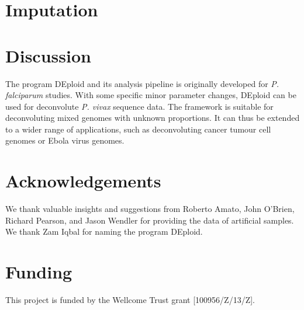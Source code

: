 \documentclass{bioinfo}
\begin{document}
\section{Imputation}


\section{Discussion}
The program DEploid and its analysis pipeline is originally developed for {\it P. falciparum} studies. With some specific minor parameter changes, DEploid can be used for deconvolute {\it P. vivax} sequence data. The framework is suitable for deconvoluting mixed genomes with unknown proportions. It can thus be extended to a wider range of applications, such as deconvoluting cancer tumour cell genomes or Ebola virus genomes.



\section*{Acknowledgements}
We thank valuable insights and suggestions from Roberto Amato, John O'Brien, Richard Pearson, and Jason Wendler for providing the data of artificial samples. We thank Zam Iqbal for naming the program DEploid.

\section*{Funding}
This project is funded by the Wellcome Trust grant [100956/Z/13/Z].\\
~\\


%
%
%
%
%
%
%
%
%
%
\end{document}
